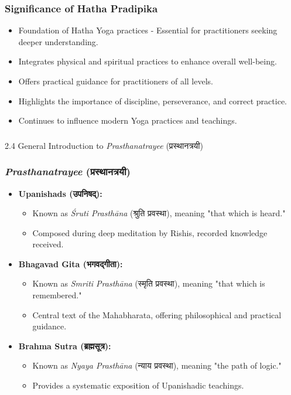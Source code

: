 \begin{frame}[fragile]\frametitle{Significance of Hatha Pradipika}

      \begin{itemize}
		\item Foundation of Hatha Yoga practices - Essential for practitioners seeking deeper understanding.
		\item Integrates physical and spiritual practices to enhance overall well-being.
		\item Offers practical guidance for practitioners of all levels.
		\item Highlights the importance of discipline, perseverance, and correct practice.
		\item Continues to influence modern Yoga practices and teachings.
	  \end{itemize}

\end{frame}


\begin{frame}[fragile]\frametitle{}
\begin{center}
{\Large 2.4 General Introduction to \textit{Prasthanatrayee} (प्रस्थानत्रयी)}
\end{center}
\end{frame}

\begin{frame}[fragile]\frametitle{\textit{Prasthanatrayee} (प्रस्थानत्रयी)}
    \begin{itemize}
        \item \textbf{Upanishads (उपनिषद्):}
        \begin{itemize}
            \item Known as \textit{Śruti Prasthāna} (श्रुति प्रवस्था), meaning "that which is heard."
            \item Composed during deep meditation by Rishis, recorded knowledge received.
        \end{itemize}
        \item \textbf{Bhagavad Gita (भगवद्गीता):}
        \begin{itemize}
            \item Known as \textit{Smriti Prasthāna} (स्मृति प्रवस्था), meaning "that which is remembered."
            \item Central text of the Mahabharata, offering philosophical and practical guidance.
        \end{itemize}
        \item \textbf{Brahma Sutra (ब्रह्मसूत्र):}
        \begin{itemize}
            \item Known as \textit{Nyaya Prasthāna} (न्याय प्रवस्था), meaning "the path of logic."
            \item Provides a systematic exposition of Upanishadic teachings.
        \end{itemize}
    \end{itemize}
\end{frame}

